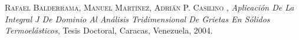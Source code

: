 \documentclass[11pt,a4paper]{article}
\begin{document}
\begin{thebibliography}{X}
 \textsc{Rafael Balderrama, Manuel Mart{\'\i}nez, Adri{\'a}n P. Casilino },
\textit{Aplicaci{\'o}n De La Integral J De Dominio Al An{\'a}lisis Tridimensional De Grietas En S{\'o}lidos Termoel{\'a}sticos}, Tesis Doctoral,
Caracas, Venezuela, 2004.
\end{thebibliography}
\end{document}
